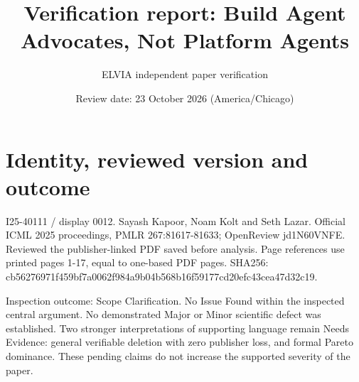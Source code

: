 \documentclass[10pt]{article}
\title{Verification report: Build Agent Advocates, Not Platform Agents}
\author{ELVIA independent paper verification}
\date{Review date: 23 October 2026 (America/Chicago)}
\begin{document}
\maketitle
\section*{Identity, reviewed version and outcome}
I25-40111 / display 0012. Sayash Kapoor, Noam Kolt and Seth Lazar. Official ICML 2025 proceedings, PMLR 267:81617-81633; OpenReview jd1N60VNFE. Reviewed the publisher-linked PDF saved before analysis. Page references use printed pages 1-17, equal to one-based PDF pages. SHA256: cb56276971f459bf7a0062f984a9b04b568b16f59177cd20efc43cea47d32c19.\par
Inspection outcome: Scope Clarification. No Issue Found within the inspected central argument. No demonstrated Major or Minor scientific defect was established. Two stronger interpretations of supporting language remain Needs Evidence: general verifiable deletion with zero publisher loss, and formal Pareto dominance. These pending claims do not increase the supported severity of the paper.\par
\end{document}
